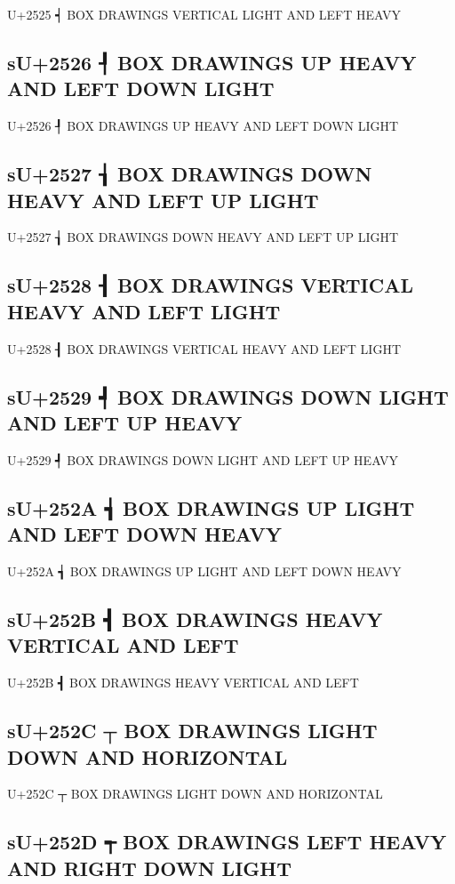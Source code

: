 U+2525 ┥ BOX DRAWINGS VERTICAL LIGHT AND LEFT HEAVY

\subsection{sU+2526 ┦ BOX DRAWINGS UP HEAVY AND LEFT DOWN LIGHT}

U+2526 ┦ BOX DRAWINGS UP HEAVY AND LEFT DOWN LIGHT

\subsection{sU+2527 ┧ BOX DRAWINGS DOWN HEAVY AND LEFT UP LIGHT}

U+2527 ┧ BOX DRAWINGS DOWN HEAVY AND LEFT UP LIGHT

\subsection{sU+2528 ┨ BOX DRAWINGS VERTICAL HEAVY AND LEFT LIGHT}

U+2528 ┨ BOX DRAWINGS VERTICAL HEAVY AND LEFT LIGHT

\subsection{sU+2529 ┩ BOX DRAWINGS DOWN LIGHT AND LEFT UP HEAVY}

U+2529 ┩ BOX DRAWINGS DOWN LIGHT AND LEFT UP HEAVY

\subsection{sU+252A ┪ BOX DRAWINGS UP LIGHT AND LEFT DOWN HEAVY}

U+252A ┪ BOX DRAWINGS UP LIGHT AND LEFT DOWN HEAVY

\subsection{sU+252B ┫ BOX DRAWINGS HEAVY VERTICAL AND LEFT}

U+252B ┫ BOX DRAWINGS HEAVY VERTICAL AND LEFT

\subsection{sU+252C ┬ BOX DRAWINGS LIGHT DOWN AND HORIZONTAL}

U+252C ┬ BOX DRAWINGS LIGHT DOWN AND HORIZONTAL

\subsection{sU+252D ┭ BOX DRAWINGS LEFT HEAVY AND RIGHT DOWN LIGHT}

